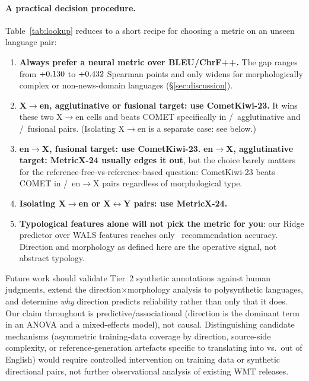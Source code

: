 \documentclass[11pt]{article}
\begin{document}
\paragraph{A practical decision procedure.} Table~\ref{tab:lookup} reduces to a short recipe for choosing a metric on an unseen language pair:
\begin{enumerate}
  \item \textbf{Always prefer a neural metric over BLEU/ChrF++.} The gap ranges from $+0.130$ to $+0.432$ Spearman points and only widens for morphologically complex or non-news-domain languages (\S\ref{sec:discussion}).
  \item \textbf{X$\to$en, agglutinative or fusional target: use CometKiwi-23.} It wins these two X$\to$en cells and beats COMET specifically in \WinXtoEnAgglutin/\WinTotalXtoEnAgglutin\ agglutinative and \WinXtoEnFusional/\WinTotalXtoEnFusional\ fusional pairs. (Isolating X$\to$en is a separate case: see below.)
  \item \textbf{en$\to$X, fusional target: use CometKiwi-23.} \textbf{en$\to$X, agglutinative target: MetricX-24 usually edges it out}, but the choice barely matters for the reference-free-vs-reference-based question: CometKiwi-23 beats COMET in \BeatsCometEntoXTotal/\EntoXTotalPairs\ en$\to$X pairs regardless of morphological type.
  \item \textbf{Isolating X$\to$en or X$\leftrightarrow$Y pairs: use MetricX-24.}
  \item \textbf{Typological features alone will not pick the metric for you}: our Ridge predictor over WALS \citep{wals} features reaches only \RidgeRecAcc\ recommendation accuracy. Direction and morphology as defined here are the operative signal, not abstract typology.
\end{enumerate}

Future work should validate Tier~2 synthetic annotations against human judgments, extend the direction$\times$morphology analysis to polysynthetic languages, and determine \emph{why} direction predicts reliability rather than only that it does. Our claim throughout is predictive/associational (direction is the dominant term in an ANOVA and a mixed-effects model), not causal. Distinguishing candidate mechanisms (asymmetric training-data coverage by direction, source-side complexity, or reference-generation artefacts specific to translating into vs.\ out of English) would require controlled intervention on training data or synthetic directional pairs, not further observational analysis of existing WMT releases.
\end{document}
